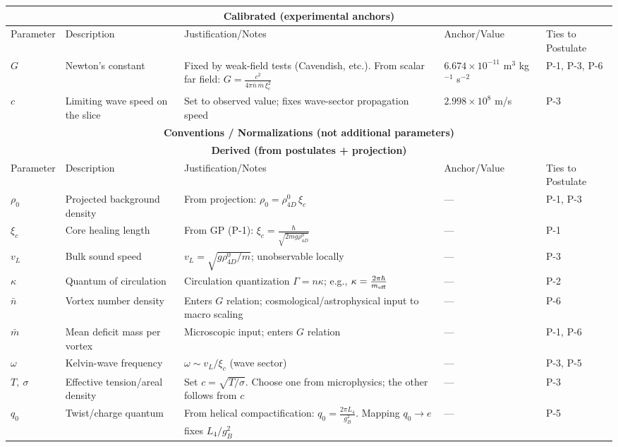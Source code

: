 \begin{table}[H]
\centering
\small
\begin{tabularx}{\linewidth}{|p{1.7cm}|p{3.2cm}|X|p{2.4cm}|p{2.1cm}|}
\hline
\multicolumn{5}{|c|}{\textbf{Calibrated (experimental anchors)}} \\
\hline
Parameter & Description & Justification/Notes & Anchor/Value & Ties to Postulate \\
\hline
$G$ & Newton's constant & Fixed by weak-field tests (Cavendish, etc.). From scalar far field: $G=\frac{c^2}{4\pi\bar n\,\bar m\,\xi_c^2}$ & $6.674\times10^{-11}$ m$^3$ kg$^{-1}$ s$^{-2}$ & P-1, P-3, P-6 \\
\hline
$c$ & Limiting wave speed on the slice & Set to observed value; fixes wave-sector propagation speed & $2.998\times10^{8}$ m/s & P-3 \\
\hline
\multicolumn{5}{|c|}{\textbf{Conventions / Normalizations (not additional parameters)}} \\
\hline
\multicolumn{5}{|c|}{\textbf{Derived (from postulates + projection)}} \\
\hline
Parameter & Description & Justification/Notes & Anchor/Value & Ties to Postulate \\
\hline
$\rho_0$ & Projected background density & From projection: $\rho_0=\rho_{4D}^0\,\xi_c$ & --- & P-1, P-3 \\
\hline
$\xi_c$ & Core healing length & From GP (P-1): $\xi_c=\frac{\hbar}{\sqrt{2mg\rho_{4D}^0}}$ & --- & P-1 \\
\hline
$v_L$ & Bulk sound speed & $v_L=\sqrt{g\rho_{4D}^0/m}$; unobservable locally & --- & P-3 \\
\hline
$\kappa$ & Quantum of circulation & Circulation quantization $\Gamma=n\kappa$; e.g., $\kappa=\frac{2\pi\hbar}{m_{\rm eff}}$ & --- & P-2 \\
\hline
$\bar n$ & Vortex number density & Enters $G$ relation; cosmological/astrophysical input to macro scaling & --- & P-6 \\
\hline
$\bar m$ & Mean deficit mass per vortex & Microscopic input; enters $G$ relation & --- & P-1, P-6 \\
\hline
$\omega$ & Kelvin-wave frequency & $\omega\sim v_L/\xi_c$ (wave sector) & --- & P-3, P-5 \\
\hline
$T,\ \sigma$ & Effective tension/areal density & Set $c=\sqrt{T/\sigma}$. Choose one from microphysics; the other follows from $c$ & --- & P-3 \\
\hline
$q_0$ & Twist/charge quantum & From helical compactification: $q_0=\frac{2\pi L_4}{g_B^2}$. Mapping $q_0\to e$ fixes $L_4/g_B^2$ & --- & P-5 \\

\end{tabularx}
\end{table}
